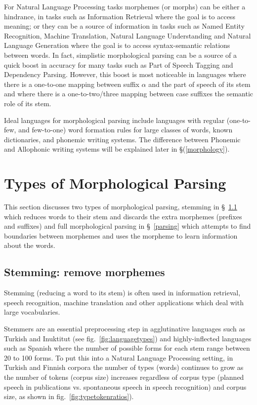 \documentclass[runningheads,a4paper]{llncs}
\begin{document}
For Natural Language Processing tasks morphemes (or morphs) can be either a hindrance, in tasks such as Information Retrieval where the goal is to access meaning; or they can be a source of information in tasks such as Named Entity Recognition, Machine Translation, Natural Language Understanding and Natural Language Generation where the goal is to access syntax-semantic relations between words. In fact, simplistic morphological parsing can be a source of a quick boost in accuracy for many tasks such as Part of Speech Tagging and Dependency Parsing. However, this boost is most noticeable in languages where there is a one-to-one mapping between suffix $\alpha$ and the part of speech of its stem and where there is a one-to-two/three mapping between case suffixes the semantic role of its stem. 

Ideal languages for morphological parsing include languages with  regular (one-to-few, and few-to-one) word formation rules for large classes of words, known dictionaries, and phonemic writing systems. The difference between Phonemic and Allophonic writing systems will be explained later in \S (\ref{morphology}).

\section{Types of Morphological Parsing}
\label{typesof}
This section discusses two types of morphological parsing, stemming in \S~\ref{stemming} which reduces words to their stem and discards the extra morphemes (prefixes and suffixes) and full morphological parsing in \S~\ref{parsing} which attempts to find boundaries between morphemes and uses the morpheme to learn information about the words. 
\subsection{Stemming: remove morphemes}
\label{stemming}
Stemming (reducing a word to its stem) is often used in information retrieval, speech recognition, machine translation and other applications which deal with large vocabularies. 

Stemmers are an essential preprocessing step in agglutinative languages such as Turkish and Inuktitut (see fig.~\ref{fig:languagetypes}) and highly-inflected languages such as Spanish where the number of possible forms for each stem range between 20 to 100 forms. To put this into a Natural Language Processing setting, in Turkish and Finnish corpora the number of types (words) continues to grow as the number of tokens (corpus size) increases regardless of corpus type (planned speech in publications vs. spontaneous speech in speech recognition) and corpus size, as shown in fig.~\ref{fig:typetokenratios}). 
\end{document}
